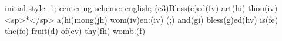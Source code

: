 initial-style: 1;
centering-scheme: english;
(c3)Bless(e)ed(fv) art(hi) thou(iv) <sp>*</sp> a(hi)mong(jh) wom(iv)en:(iv) (;) and(gi) bless(g)ed(hv) is(fe) the(fe) fruit(d) of(ev) thy(fh) womb.(f)
